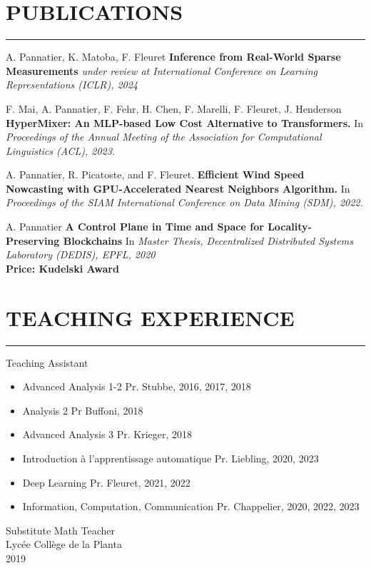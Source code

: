 \documentclass{article}
\let\oldhrule\hrule
\renewcommand{\hrule}{\color{LightGray}\oldhrule\color{black}}
\newcommand{\rubric}[1]{
    \color{MediumGray}

    \section*{\montserratlight \large \MakeUppercase{#1}} 
    \hrule
    \vspace{4mm}
    \raggedright
}
\begin{document}
\begin{minipage}[t]{0.65\textwidth}
  \rubric{Publications}
  \small
  A. Pannatier, K. Matoba, F. Fleuret \textbf{Inference from Real-World Sparse Measurements} \textit{under review at International Conference on Learning Representations (ICLR), 2024}
  \vspace{4mm}

  F. Mai, A. Pannatier, F. Fehr, H. Chen, F. Marelli, F. Fleuret, J. Henderson \textbf{HyperMixer: An MLP-based Low Cost Alternative to Transformers.} In \textit{Proceedings of the Annual Meeting of the Association for Computational Linguistics (ACL), 2023.}
  \vspace{4mm}

  A. Pannatier, R. Picatoste, and F. Fleuret. \textbf{Efficient Wind Speed Nowcasting with GPU-Accelerated Nearest Neighbors Algorithm.} In \textit{Proceedings of the SIAM International Conference on Data Mining (SDM), 2022.}
  \vspace{4mm}

  A. Pannatier \textbf{A Control Plane in Time and Space for Locality-Preserving Blockchains} In \textit{Master Thesis, Decentralized Distributed Systems Laboratory (DEDIS), EPFL, 2020} \\
  \textbf{Price: Kudelski Award}

  \rubric{Teaching Experience}

  \color{DeepGray}
  \large Teaching Assistant
  \color{MediumGray} \small
  \begin{itemize}
    \item \color{DeepGray}Advanced Analysis 1-2  \color{MediumGray} Pr. Stubbe, 2016, 2017, 2018
    \item \color{DeepGray}Analysis 2  \color{MediumGray} Pr Buffoni, 2018
    \item \color{DeepGray}Advanced Analysis 3  \color{MediumGray} Pr. Krieger, 2018
    \item \color{DeepGray}Introduction à l'apprentissage automatique  \color{MediumGray} Pr. Liebling, 2020, 2023
    \item \color{DeepGray}Deep Learning  \color{MediumGray} Pr. Fleuret, 2021, 2022
    \item \color{DeepGray}Information, Computation, Communication  \color{MediumGray} Pr. Chappelier, 2020, 2022, 2023
  \end{itemize}

  \vspace{4mm}
  \color{DeepGray}
  \large Substitute Math Teacher \\
  \color{MediumGray} \small
  Lycée Collège de la Planta \\
  2019


\end{minipage}
\end{document}
